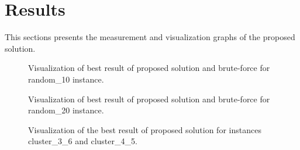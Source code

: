 \clearpage%
\newpage


\section{Results}\label{sec:results}
This sections presents the measurement and visualization graphs of the proposed solution.

\begin{figure}
    \centering
    \caption[Random\_10 instance solution visualization for brute-force]
        {Visualization of best result of proposed solution and brute-force for random\_10 instance.}
    \label{fig:visualization-random10}%
\end{figure}

\begin{figure}
    \centering
    \caption[Random\_10 instance solution visualization for proposed solution]
        {Visualization of best result of proposed solution and brute-force for random\_20 instance.}
    \label{fig:visualization-random20}%
\end{figure}
\clearpage%

\begin{figure}
    \centering
    \caption[Solution visualization of clustering instances for proposed solution]
    {Visualization of the best result of proposed solution for instances cluster\_3\_6 and cluster\_4\_5.}
    \label{fig:visualization-cluster}%
\end{figure}

